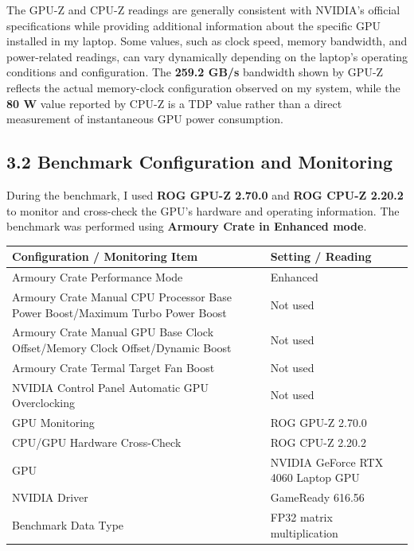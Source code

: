\documentclass[11pt]{article}
\begin{document}
The GPU-Z and CPU-Z readings are generally consistent with NVIDIA's
official specifications while providing additional information about the
specific GPU installed in my laptop. Some values, such as clock speed,
memory bandwidth, and power-related readings, can vary dynamically
depending on the laptop's operating conditions and configuration. The
\textbf{259.2 GB/s} bandwidth shown by GPU-Z reflects the actual
memory-clock configuration observed on my system, while the \textbf{80
W} value reported by CPU-Z is a TDP value rather than a direct
measurement of instantaneous GPU power consumption.

\subsection{3.2 Benchmark Configuration and
Monitoring}\label{benchmark-configuration-and-monitoring}

During the benchmark, I used \textbf{ROG GPU-Z 2.70.0} and \textbf{ROG
CPU-Z 2.20.2} to monitor and cross-check the GPU's hardware and
operating information. The benchmark was performed using \textbf{Armoury
Crate in Enhanced mode}.

{\def\LTcaptype{table} %
\begin{longtable}[]{@{}
  >{\raggedright\arraybackslash}p{}
  >{\raggedright\arraybackslash}p{}@{}}
\toprule\noalign{}
\begin{minipage}[b]{\linewidth}\raggedright
Configuration / Monitoring Item
\end{minipage} & \begin{minipage}[b]{\linewidth}\raggedright
Setting / Reading
\end{minipage} \\
\midrule\noalign{}
\endhead
\bottomrule\noalign{}
\endlastfoot
Armoury Crate Performance Mode & Enhanced \\
Armoury Crate Manual CPU Processor Base Power Boost/Maximum Turbo Power
Boost & Not used \\
Armoury Crate Manual GPU Base Clock Offset/Memory Clock Offset/Dynamic
Boost & Not used \\
Armoury Crate Termal Target Fan Boost & Not used \\
NVIDIA Control Panel Automatic GPU Overclocking & Not used \\
GPU Monitoring & ROG GPU-Z 2.70.0 \\
CPU/GPU Hardware Cross-Check & ROG CPU-Z 2.20.2 \\
GPU & NVIDIA GeForce RTX 4060 Laptop GPU \\
NVIDIA Driver & GameReady 616.56 \\
Benchmark Data Type & FP32 matrix multiplication \\
\end{longtable}
}
\end{document}
